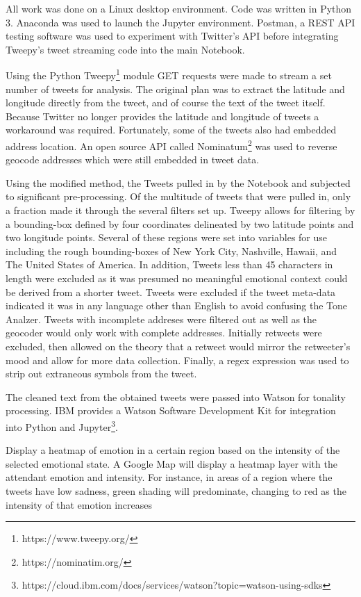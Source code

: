 \documentclass[12pt, oneside]{article}
\begin{document}
All work was done on a Linux desktop environment. Code was written in Python
3. Anaconda was used to launch the Jupyter environment. Postman, a REST API testing software was used to experiment with Twitter's
API\cite{Postman} before integrating Tweepy's tweet streaming code into the
main Notebook.

Using the Python Tweepy\footnote{https://www.tweepy.org/} module GET requests
were made to stream a set number of
tweets for analysis. The original plan was to extract the latitude and
longitude directly from the tweet, and of course
the text of the tweet itself. Because Twitter no longer provides the latitude
and longitude of tweets a workaround was required. Fortunately, some of the
tweets also had embedded address location. An open source API called
Nominatum\footnote{https://nominatim.org/} was used to reverse geocode
addresses which were still embedded in tweet data.

Using the modified method, the Tweets pulled in by the Notebook and subjected
to significant pre-processing. Of the multitude of tweets that were pulled in,
only a fraction made it through the several filters set up. Tweepy allows for
filtering by a bounding-box defined by four coordinates delineated by
two latitude points and two longitude points. Several of these regions were set
into variables for use including the rough bounding-boxes of New York
City, Nashville, Hawaii, and The United States of America. In addition, Tweets
less than 45 characters in length were excluded as it was presumed no
meaningful emotional context could be derived from a shorter tweet.
Tweets were excluded if the tweet meta-data indicated it was in any language
other than English to avoid confusing the Tone Analzer. Tweets with incomplete
addreses were filtered out as well as the geocoder would only work with
complete addresses. Initially retweets were excluded, then allowed on the
theory that a retweet would mirror the retweeter's mood and allow for more data
collection. Finally, a regex expression was used to strip out extraneous
symbols from the tweet.

The cleaned text from the obtained tweets were passed into Watson for tonality
processing. IBM provides a Watson Software Development Kit for integration into
Python and Jupyter\footnote{https://cloud.ibm.com/docs/services/watson?topic=watson-using-sdks}.

Display a heatmap of emotion in a certain region based on the intensity
of the selected emotional state. A Google
Map will display a heatmap layer with the attendant emotion and intensity. For
instance, in areas of a region where the tweets have low sadness, green shading
will predominate, changing to red as the intensity of that emotion increases
\end{document}
